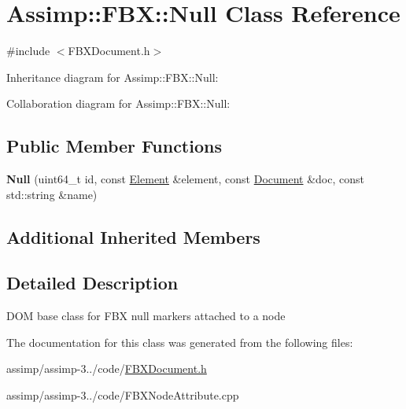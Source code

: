 \hypertarget{class_assimp_1_1_f_b_x_1_1_null}{\section{Assimp\+:\+:F\+B\+X\+:\+:Null Class Reference}
\label{class_assimp_1_1_f_b_x_1_1_null}
}


{\ttfamily \#include $<$F\+B\+X\+Document.\+h$>$}



Inheritance diagram for Assimp\+:\+:F\+B\+X\+:\+:Null\+:


Collaboration diagram for Assimp\+:\+:F\+B\+X\+:\+:Null\+:
\subsection*{Public Member Functions}
\begin{DoxyCompactItemize}
\item 
\hypertarget{class_assimp_1_1_f_b_x_1_1_null_abc75534e27b4f4b150c162af5eaca96a}{{\bfseries Null} (uint64\+\_\+t id, const \hyperlink{class_assimp_1_1_f_b_x_1_1_element}{Element} \&element, const \hyperlink{class_assimp_1_1_f_b_x_1_1_document}{Document} \&doc, const std\+::string \&name)}\label{class_assimp_1_1_f_b_x_1_1_null_abc75534e27b4f4b150c162af5eaca96a}

\end{DoxyCompactItemize}
\subsection*{Additional Inherited Members}


\subsection{Detailed Description}
D\+O\+M base class for F\+B\+X null markers attached to a node 

The documentation for this class was generated from the following files\+:\begin{DoxyCompactItemize}
\item 
assimp/assimp-\/3../code/\hyperlink{_f_b_x_document_8h}{F\+B\+X\+Document.\+h}\item 
assimp/assimp-\/3../code/F\+B\+X\+Node\+Attribute.\+cpp\end{DoxyCompactItemize}
